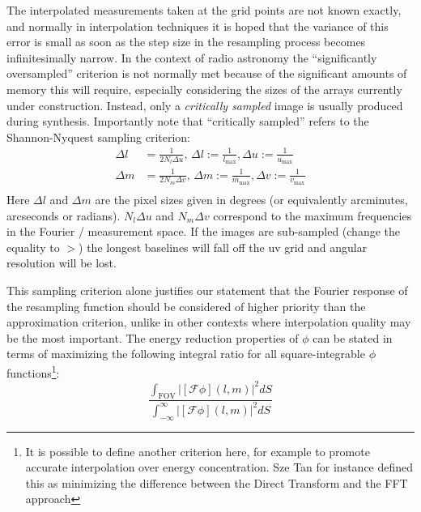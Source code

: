  The interpolated measurements taken at the grid points are not known exactly, and normally in interpolation techniques it is 
 hoped that the variance of this error is small as soon as the step size in the resampling process becomes infinitesimally narrow. 
 In the context of radio astronomy the ``significantly oversampled'' criterion is not normally met because of the significant amounts 
 of memory this will require, especially considering the sizes of the arrays currently under construction. Instead, only a 
 \emph{critically sampled} image is usually produced during synthesis. Importantly note that ``critically sampled'' refers to 
 the Shannon-Nyquest sampling criterion:
 \begin{equation}
  \label{eqn_img_sampling}
  \begin{split}
    \Delta{l} &= \frac{1}{2N_l\Delta{u}}\text{, }\Delta{l}:=\frac{1}{l_{\text{max}}},\Delta{u}:=\frac{1}{u_{\text{max}}}\\
    \Delta{m} &= \frac{1}{2N_m\Delta{v}}\text{, }\Delta{m}:=\frac{1}{m_{\text{max}}},\Delta{v}:=\frac{1}{v_{\text{max}}}\\
  \end{split}
 \end{equation}
 Here $\Delta{l}$ and $\Delta{m}$ are the pixel sizes given in degrees (or equivalently arcminutes, arcseconds or radians). $N_l\Delta{u}$ and
 $N_m\Delta{v}$ correspond to the maximum frequencies in the Fourier / measurement space. If the images are 
 sub-sampled (change the equality to $>$) the longest baselines will fall off the uv grid and angular resolution will be lost. 
 
 This sampling criterion alone justifies our statement that the Fourier response of the resampling function should be considered of higher priority
 than the approximation criterion, unlike in other contexts where interpolation quality may be the most important. The energy reduction properties of
 $\phi$ can be stated in terms of maximizing the following integral ratio for all square-integrable $\phi$ functions\footnote{It is possible to
 define another criterion here, for example to promote accurate interpolation over energy concentration. Sze Tan \cite{tan1986aperture} for 
 instance defined this as minimizing the difference between the Direct Transform and the FFT approach}:
 \begin{equation}
  \label{eqn_aliasing_energy}
  \frac{\int_{\text{FOV}}{|[\mathcal{F}\phi](l,m)|^2dS}}{\int_{-\infty}^{\infty}{|[\mathcal{F}\phi](l,m)|^2dS}}
 \end{equation}
 
